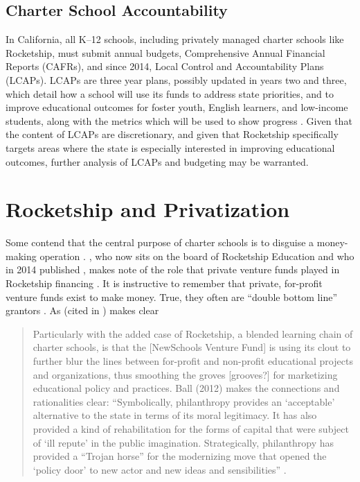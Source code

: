 \subsection{Charter School Accountability}\label{sec:charter-accountability}\indent

In California, all K–12 schools, including privately managed charter schools like Rocketship, must submit annual budgets, Comprehensive Annual Financial Reports (CAFRs), and since 2014, Local Control and Accountability Plans (LCAPs). LCAPs are three year plans, possibly updated in years two and three, which detail how a school will use its funds to address state priorities, and to improve educational outcomes for foster youth, English learners, and low-income students, along with the metrics which will be used to show progress \parencite[66–84]{Aguinaldo.etal2021}. Given that the content of LCAPs are discretionary, and given that Rocketship specifically targets areas where the state is especially interested in improving educational outcomes, further analysis of LCAPs and budgeting may be warranted.
\section{Rocketship and Privatization}\label{sec:rocketship-privatization}\indent

Some contend that the central purpose of charter schools is to disguise a money-making operation \parencite{Saltman2018c}. \citeauthor{Whitmire2014}, who now sits on the board of Rocketship Education and who in 2014 published , makes note of the role that private venture funds played in Rocketship financing \parencite[25,65]{Whitmire2014}. It is instructive to remember that private, for-profit venture funds exist to make money. True, they often are ``double bottom line'' grantors \parencite{Clark.etal2004}. As \citeauthor{Ball2012} (cited in \textcite[75]{Tewksbury2016}) makes clear
\begin{quotation}\noindent
Particularly with the added case of Rocketship, a blended learning chain of charter schools, is that the [NewSchools Venture Fund] is using its clout to further blur the lines between for-profit and non-profit educational projects and organizations, thus smoothing the groves [grooves?] for marketizing educational policy and practices. Ball (2012) makes the connections and rationalities clear: ``Symbolically, philanthropy provides an `acceptable' alternative to the state in terms of its moral legitimacy.  It has also provided a kind of rehabilitation for the forms of capital that were subject of `ill repute' in the public imagination. Strategically, philanthropy has provided a ``Trojan horse'' for the modernizing move that opened the `policy door' to new actor and new ideas and sensibilities'' \parencite[32]{Ball2012}.
\end{quotation}

